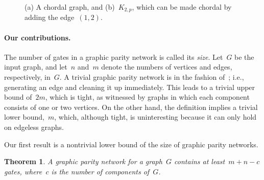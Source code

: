 \documentclass[a4paper,cleveref, autoref, 11pt, fleqn, thm-restate]{article}
\theoremstyle{plain}
\newtheorem{theorem}{Theorem}[section]
\begin{document}
\begin{figure}[ht!]
  \centering\small
  \hspace{1cm}
  \caption{(a) A chordal graph, and (b)~$K_{2, p}$, which can be made chordal by adding the edge~$(1, 2)$.}
  \label{fig:example-graphs}
\end{figure}

\paragraph*{Our contributions.}

The number of gates in a graphic parity network is called its \emph{size}.
Let~$G$ be the input graph, and let~$n$ and~$m$ denote the numbers of vertices and edges, respectively, in~$G$.
A trivial graphic parity network is in the fashion of~; i.e., generating an edge and cleaning it up immediately.  This leads to a trivial upper bound of~$2 m$, which is tight, as witnessed by graphs in which each component consists of one or two vertices.
On the other hand, the definition implies a trivial lower bound,~$m$, which, although tight, is uninteresting because it can only hold on edgeless graphs.

Our first result is a nontrivial lower bound of the size of graphic parity networks.

\begin{theorem}
  \label{thm:opt-pn-size-ctrb}
  A graphic parity network for a graph~$G$ contains at least~$m+n-c$ gates, where~$c$ is the number of components of~$G$.
\end{theorem}
\end{document}
